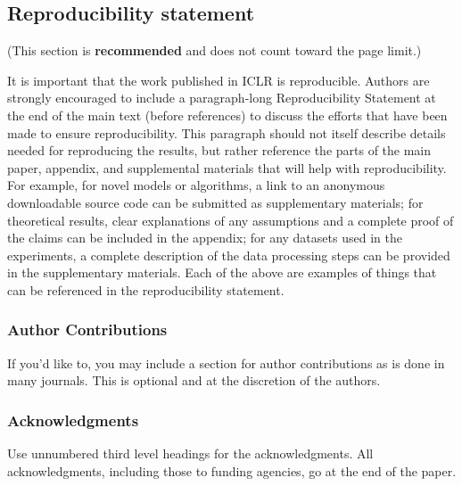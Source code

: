 \documentclass{article} %
\numberwithin{equation}{section}
\begin{document}
\subsection*{Reproducibility statement}

(This section is \textbf{recommended} and does not count toward the page limit.)

It is important that the work published in ICLR is reproducible. Authors are
strongly encouraged to include a paragraph-long Reproducibility Statement at the
end of the main text (before references) to discuss the efforts that have been
made to ensure reproducibility. This paragraph should not itself describe
details needed for reproducing the results, but rather reference the parts of
the main paper, appendix, and supplemental materials that will help with
reproducibility. For example, for novel models or algorithms, a link to an
anonymous downloadable source code can be submitted as supplementary materials;
for theoretical results, clear explanations of any assumptions and a complete
proof of the claims can be included in the appendix; for any datasets used in
the experiments, a complete description of the data processing steps can be
provided in the supplementary materials. Each of the above are examples of
things that can be referenced in the reproducibility statement.

\subsubsection*{Author Contributions}
If you'd like to, you may include  a section for author contributions as is done
in many journals. This is optional and at the discretion of the authors.

\subsubsection*{Acknowledgments}
Use unnumbered third level headings for the acknowledgments. All
acknowledgments, including those to funding agencies, go at the end of the paper.


\clearpage




\clearpage
\appendix


\end{document}
